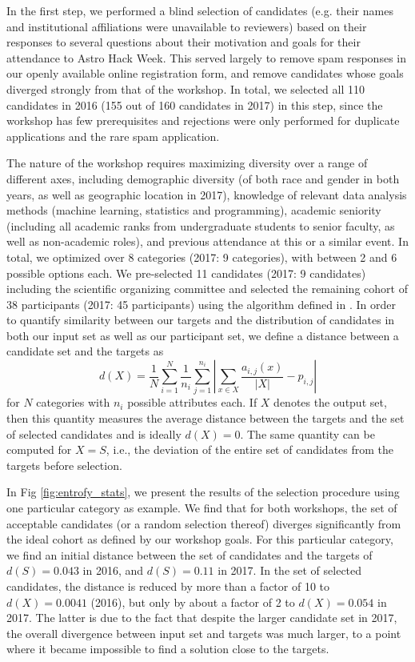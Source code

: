 \documentclass[10pt,letterpaper]{article}
\begin{document}
In the first step, we performed a blind selection of candidates (e.g. their names and institutional affiliations were unavailable to reviewers) based on their responses to several questions about their motivation and goals for their attendance to Astro Hack Week. This served largely to remove spam responses in our openly available online registration form, and remove candidates whose goals diverged strongly from that of the workshop. In total, we selected all 110 candidates in 2016 (155 out of 160 candidates in 2017) in this step, since the workshop has few prerequisites and rejections were only performed for duplicate applications and the rare spam application.

The nature of the workshop requires maximizing diversity over a range of different axes, including demographic diversity (of both race and gender in both years, as well as geographic location in 2017), knowledge of relevant data analysis methods (machine learning, statistics and programming), academic seniority (including all academic ranks from undergraduate students to senior faculty, as well as non-academic roles), and previous attendance at this or a similar event. In total, we optimized over 8 categories (2017: 9 categories), with between 2 and 6 possible options each. 
We pre-selected 11 candidates (2017: 9 candidates) including the scientific organizing committee and selected the remaining cohort of 38 participants (2017: 45 participants) using the algorithm defined in . In order to quantify similarity between our targets and the distribution of candidates in both our input set as well as our participant set, we define a distance between a candidate set and the targets as 
\begin{equation}
d(X) = \frac{1}{N}\sum_{i=1}^{N} \frac{1}{n_i}\sum_{j=1}^{n_i}\left| \sum_{x \in X} \frac{a_{i,j}(x)}{|X|} - p_{i,j} \right| 
\end{equation}
for $N$ categories with $n_i$ possible attributes each. If $X$ denotes the output set, then this quantity measures the average distance between the targets and the set of selected candidates and is ideally $d(X)=0$. The same quantity can be computed for $X = S$, i.e., the deviation of the entire set of candidates from the targets before selection.

In Fig \ref{fig:entrofy_stats}, we present the results of the selection procedure using one particular category as example.
We find that for both workshops, the set of acceptable candidates (or a random selection thereof) diverges significantly from the ideal cohort as defined by our workshop goals.
For this particular category, we find an initial distance between the set of candidates and the targets of $d(S)=0.043$ in 2016, and $d(S)=0.11$ in 2017.
In the set of selected candidates, the distance is reduced by more than a factor of 10 to $d(X)=0.0041$ (2016), but only by about a factor of 2 to $d(X)=0.054$ in 2017.
The latter is due to the fact that despite the larger candidate set in 2017, the overall divergence between input set and targets was much larger, to a point where it became impossible to find a solution close to the targets.
\end{document}
